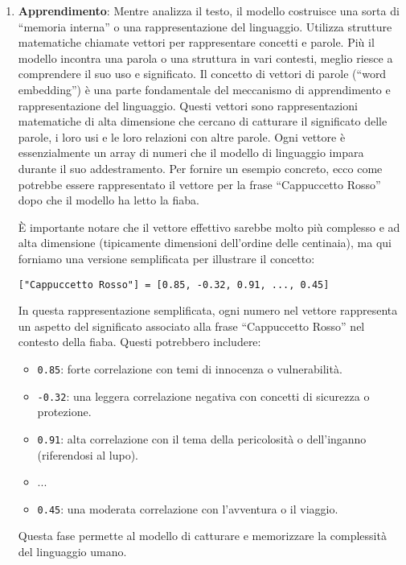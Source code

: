 \begin{enumerate}
                \item
                    \textbf{Apprendimento}: Mentre analizza il testo, il modello costruisce una sorta di ``memoria interna'' o una rappresentazione del linguaggio. Utilizza strutture matematiche chiamate vettori per rappresentare concetti e parole. Più il modello incontra una parola o una struttura in vari contesti, meglio riesce a comprendere il suo uso e significato. Il concetto di vettori di parole (``word embedding'') è una parte fondamentale del meccanismo di apprendimento e rappresentazione del linguaggio. Questi vettori sono rappresentazioni matematiche di alta dimensione che cercano di catturare il significato delle parole, i loro usi e le loro relazioni con altre parole. Ogni vettore è essenzialmente un array di numeri che il modello di linguaggio impara durante il suo addestramento. Per fornire un esempio concreto, ecco come potrebbe essere rappresentato il vettore per la frase ``Cappuccetto Rosso'' dopo che il modello ha letto la fiaba.

                    È importante notare che il vettore effettivo sarebbe molto più complesso e ad alta dimensione (tipicamente dimensioni dell'ordine delle centinaia), ma qui forniamo una versione semplificata per illustrare il concetto:

                    \texttt{["Cappuccetto Rosso"] = [0.85, -0.32, 0.91, ..., 0.45]}

                    In questa rappresentazione semplificata, ogni numero nel vettore rappresenta un aspetto del significato associato alla frase ``Cappuccetto Rosso'' nel contesto della fiaba. Questi potrebbero includere:
                    \begin{itemize}
                        \item \texttt{0.85}: forte correlazione con temi di innocenza o vulnerabilità.
                        \item \texttt{-0.32}: una leggera correlazione negativa con concetti di sicurezza o protezione.
                        \item \texttt{0.91}: alta correlazione con il tema della pericolosità o dell'inganno (riferendosi al lupo).
                        \item ...
                        \item \texttt{0.45}: una moderata correlazione con l'avventura o il viaggio.
                    \end{itemize}
                    Questa fase permette al modello di catturare e memorizzare la complessità del linguaggio umano.


\end{enumerate}

